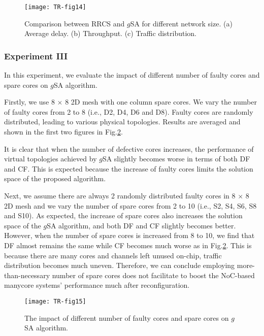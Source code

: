 \begin{figure}[h]
      \centering
        \texttt{[image: TR-fig14]}
          \caption{ Comparison between RRCS and $g$SA for different network size. (a) Average delay. (b) Throughput. (c) Traffic distribution.}
        \label{fig14}
\end{figure}


\subsubsection{Experiment III}

In this experiment, we evaluate the impact of different number of faulty cores and spare cores on $g$SA algorithm.

Firstly, we use 8 $\times$ 8 2D mesh with one column spare cores. We vary the number of faulty cores from 2 to 8 (i.e., D2, D4, D6 and D8). Faulty cores are randomly distributed, leading to various physical topologies. Results are averaged and shown in the first two figures in Fig.\ref{fig15}.

It is clear that when the number of defective cores increases, the performance of virtual topologies achieved by $g$SA slightly becomes worse in terms of both DF and CF. This is expected because the increase of faulty cores limits the solution space of the proposed algorithm.

Next, we assume there are always 2 randomly distributed faulty cores in 8 $\times$ 8 2D mesh and we vary the number of spare cores from 2 to 10 (i.e., S2, S4, S6, S8 and S10). As expected, the increase of spare cores also increases the solution space of the $g$SA algorithm, and both DF and CF slightly becomes better. However, when the number of spare cores is increased from 8 to 10, we find that DF almost remains the same while CF becomes much worse as in Fig.\ref{fig15}. This is because there are many cores and channels left unused on-chip, traffic distribution becomes much uneven. Therefore, we can conclude employing more-than-necessary number of spare cores does not facilitate to boost the NoC-based manycore systems’ performance much after reconfiguration.

\begin{figure}[h]
      \centering
        \texttt{[image: TR-fig15]}
        \caption{ The impact of different number of faulty cores and spare cores on $g$SA algorithm.}
        \label{fig15}
\end{figure}



